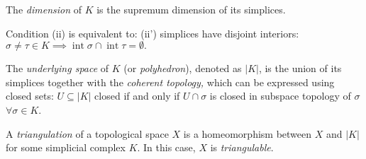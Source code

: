 \begin{multicols*}{3}
\begin{definition}[Dimension]
The \emph{dimension} of $K$ is the supremum dimension of its simplices.
\end{definition}
\rspace
\begin{rem}
Condition (ii) is equivalent to: (ii') simplices have disjoint interiors:
$\sigma \neq \tau \in K \implies \operatorname{int}  \sigma \cap \operatorname{int} \tau = \emptyset.$
\end{rem}
\rspace
\drawaline
\vspace{-1.5pc}
\begin{definition} The \emph{underlying space} of $K$ (or \emph{polyhedron}), denoted as $|K|$, is the union of its simplices together with the \emph{coherent topology,} which can be expressed using closed sets:  $U \subseteq |K|$ closed if and only if $U\cap \sigma$ is closed in subspace topology of $\sigma$ $\forall \sigma \in K$.
\end{definition}
\rspace
\begin{definition}[Triangulation]
A \emph{triangulation} of a topological space $X$ is  a homeomorphism between $X$ and $|K|$ for some simplicial complex $K$. In this case, $X$ is \emph{triangulable}.
\end{definition}
\rspace
\drawaline
\vspace{-0.5pc}

\end{multicols*}
